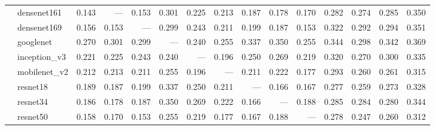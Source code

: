\begin{table}
\begin{tabular}{llrrrrrrrrrrrrr}
       & densenet161 &                 0.143 &                   --- &                 0.153 &               0.301 &                   0.225 &                   0.213 &              0.187 &              0.178 &              0.170 &               0.282 &               0.274 &               0.285 &               0.350 \\
       & densenet169 &                 0.156 &                 0.153 &                   --- &               0.299 &                   0.243 &                   0.211 &              0.199 &              0.187 &              0.153 &               0.322 &               0.292 &               0.294 &               0.351 \\
       & googlenet &                 0.270 &                 0.301 &                 0.299 &                 --- &                   0.240 &                   0.255 &              0.337 &              0.350 &              0.255 &               0.344 &               0.298 &               0.342 &               0.369 \\
       & inception_v3 &                 0.221 &                 0.225 &                 0.243 &               0.240 &                     --- &                   0.196 &              0.250 &              0.269 &              0.219 &               0.320 &               0.270 &               0.300 &               0.335 \\
       & mobilenet_v2 &                 0.212 &                 0.213 &                 0.211 &               0.255 &                   0.196 &                     --- &              0.211 &              0.222 &              0.177 &               0.293 &               0.260 &               0.261 &               0.315 \\
       & resnet18 &                 0.189 &                 0.187 &                 0.199 &               0.337 &                   0.250 &                   0.211 &                --- &              0.166 &              0.167 &               0.277 &               0.259 &               0.273 &               0.328 \\
       & resnet34 &                 0.186 &                 0.178 &                 0.187 &               0.350 &                   0.269 &                   0.222 &              0.166 &                --- &              0.188 &               0.285 &               0.284 &               0.280 &               0.344 \\
       & resnet50 &                 0.158 &                 0.170 &                 0.153 &               0.255 &                   0.219 &                   0.177 &              0.167 &              0.188 &                --- &               0.278 &               0.247 &               0.260 &               0.312 \\

\end{tabular}
\end{table}

